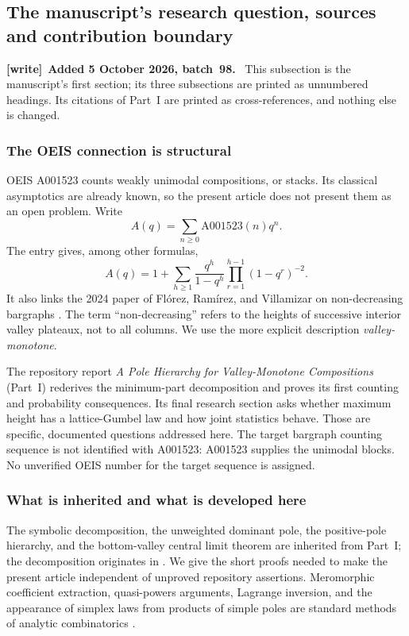 \documentclass[11pt,a4paper]{article}
\numberwithin{equation}{section}
\theoremstyle{definition}\newtheorem{definition}[theorem]{Definition}
\theoremstyle{remark}\newtheorem{remark}[theorem]{Remark}
\newenvironment{writenote}[1][]{\par\smallskip\begingroup\small
 \noindent\textbf{[write]}\if\relax\detokenize{#1}\relax\else~\textbf{#1.}\fi\ }%
 {\par\endgroup\smallskip}
\begin{document}
\subsection{The manuscript's research question, sources and contribution boundary}
\label{vmb:cw:sec:scope}
\begin{writenote}[Added 5 October 2026, batch~98]
This subsection is the manuscript's first section; its three subsections
are printed as unnumbered headings. Its citations of Part~I are printed as
cross-references, and nothing else is changed.
\end{writenote}

\subsubsection*{The OEIS connection is structural}
OEIS A001523 counts weakly unimodal compositions, or stacks. Its classical
asymptotics are already known, so the present article does not present them
as an open problem. Write
\begin{equation}
A(q)=\sum_{n\ge0}\mathrm{A001523}(n)q^n.
\end{equation}
The entry gives, among other formulas,
\begin{equation}\label{vmb:cw:eq:oeis}
 A(q)=1+\sum_{h\ge1}\frac{q^h}{1-q^h}
              \prod_{r=1}^{h-1}(1-q^r)^{-2}.
\end{equation}
It also links the 2024 paper of Fl\'orez, Ram\'irez, and Villamizar on
non-decreasing bargraphs \cite{OEIS,FRV}. The term ``non-decreasing'' refers
to the heights of successive interior valley plateaux, not to all columns.
We use the more explicit description \emph{valley-monotone}.

The repository report \emph{A Pole Hierarchy for Valley-Monotone Compositions}
(Part~I) rederives the minimum-part decomposition and proves its first
counting and probability consequences. Its final research section asks
whether maximum height has a lattice-Gumbel law and how joint statistics
behave. Those are specific, documented questions addressed here. The target
bargraph counting sequence is not identified with A001523: A001523 supplies
the unimodal blocks. No unverified OEIS number for the target sequence is
assigned.

\subsubsection*{What is inherited and what is developed here}
The symbolic decomposition, the unweighted dominant pole, the positive-pole
hierarchy, and the bottom-valley central limit theorem are inherited from
Part~I; the decomposition originates in \cite{FRV}. We give the short
proofs needed to make the present article independent of unproved repository
assertions. Meromorphic coefficient extraction, quasi-powers arguments,
Lagrange inversion, and the appearance of simplex laws from products of
simple poles are standard methods of analytic combinatorics \cite{FS}.
\end{document}
